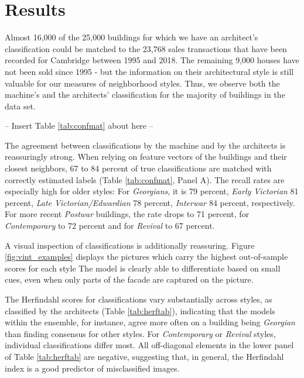 \documentclass[]{article}
\begin{document}
\hypertarget{results}{%
\section{Results}\label{results}}

Almost 16,000 of the 25,000 buildings for which we have an architect's
classification could be matched to the 23,768 sales transactions that
have been recorded for Cambridge between 1995 and 2018. The remaining
9,000 houses have not been sold since 1995 - but the information on
their architectural style is still valuable for our measures of
neighborhood styles. Thus, we observe both the machine's and the
architects' classification for the majority of buildings in the data
set.

\begin{center}
  -- Insert Table \ref{tab:confmat} about here --
\end{center}

The agreement between classifications by the machine and by the
architects is reassuringly strong. When relying on feature vectors of
the buildings and their closest neighbors, 67 to 84 percent of true
classifications are matched with correctly estimated labels (Table
\ref{tab:confmat}, Panel A). The recall rates are especially high for
older styles: For \emph{Georgians}, it is 79 percent, \emph{Early
Victorian} 81 percent, \emph{Late Victorian/Edwardian} 78 percent,
\emph{Interwar} 84 percent, respectively. For more recent \emph{Postwar}
buildings, the rate drops to 71 percent, for \emph{Contemporary} to 72
percent and for \emph{Revival} to 67 percent.

A visual inspection of classifications is additionally reassuring.
Figure \ref{fig:vint_examples} displays the pictures which carry the
highest out-of-sample scores for each style The model is clearly able to
differentiate based on small cues, even when only parts of the facade
are captured on the picture.

The Herfindahl scores for classifications vary substantially across
styles, as classified by the architects (Table \ref{tab:herftab}),
indicating that the models within the ensemble, for instance, agree more
often on a building being \emph{Georgian} than finding consensus for
other styles. For \emph{Contemporary} or \emph{Revival} styles,
individual classifications differ most. All off-diagonal elements in the
lower panel of Table \ref{tab:herftab} are negative, suggesting that, in
general, the Herfindahl index is a good predictor of misclassified
images.
\end{document}
